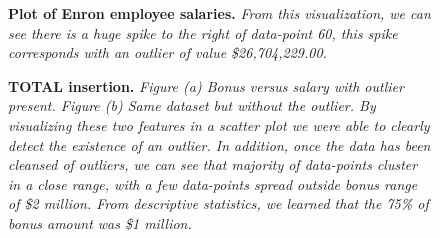 \documentclass[twoside,openright,titlepage,numbers=noenddot,headinclude,%
               footinclude=true,cleardoublepage=empty,abstractoff,BCOR=5mm,%
               paper=a4,fontsize=11pt,ngerman,american]{scrreprt}
\numberwithin{theorem}{chapter}
\numberwithin{definition}{chapter}
\numberwithin{algorithm}{chapter}
\numberwithin{figure}{chapter}
\numberwithin{table}{chapter}
\numberwithin{equation}{chapter}
\begin{document}
\begin{figure}[!hbtp]
\centering
    
    \caption{\textbf{Plot of Enron employee salaries.}\textit{ From this visualization, we can see there is a huge spike to the right of data-point 60, this spike corresponds with an outlier of value \$26,704,229.00.}}
\end{figure}

\begin{figure}[!hbtp]
\centering
    
    \caption{\textbf{TOTAL insertion.} \textit{Figure (a) Bonus versus salary with outlier present. Figure (b) Same dataset but without the outlier. By visualizing these two features in a scatter plot we were able to clearly detect the existence of an outlier. In addition, once the data has been cleansed of outliers, we can see that majority of data-points cluster in a close range, with a few data-points spread outside bonus range of \$2 million. From descriptive statistics, we learned that the 75\% of bonus amount was \$1 million. }}
\end{figure}
\end{document}
